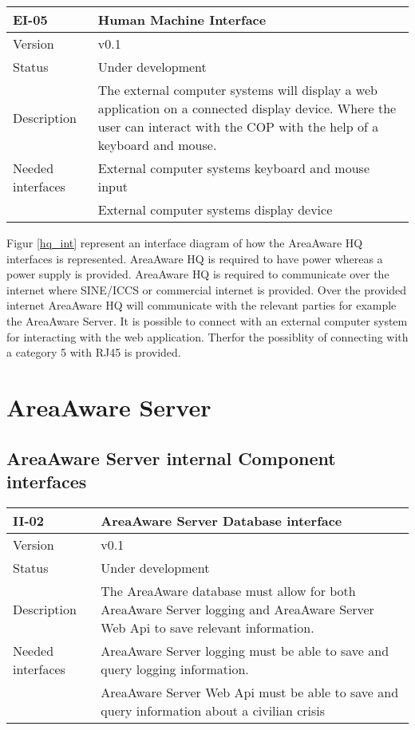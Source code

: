 \begin{longtable}{| p{3.5cm} |  p{10cm} | }
	\hline
	\textbf{EI-05} &  \textbf{Human Machine Interface} \\
	\hline
	Version & v0.1 \\
	\hline
	Status & Under development \\
	\hline
	Description & The external computer systems will display a web application on a connected display device. Where the user can interact with the COP with the help of a keyboard and mouse.
	\\
	\hline
	Needed interfaces 
	& External computer systems keyboard and mouse input \\
	& External computer systems display device \\ 
	\hline
\end{longtable}
\clearpage
{} 

Figur \ref{hq_int} represent an interface diagram of how the AreaAware HQ interfaces is represented. AreaAware HQ is required to have power whereas a power supply is provided. AreaAware HQ is required to communicate over the internet where SINE/ICCS or commercial internet is provided. Over the provided internet AreaAware HQ will communicate with the relevant parties for example the AreaAware Server. It is possible to connect with an external computer system for interacting with the web application. Therfor the possiblity of connecting with a category 5 with RJ45 is provided. 


\newpage

\section{AreaAware Server}
\label{sec:areaAwareserver}

\subsection{AreaAware Server internal Component interfaces}


\begin{longtable}{| p{3.5cm} |  p{10cm} | }
	\hline
	\textbf{II-02} &  \textbf{AreaAware Server Database interface } \\
	\hline
	Version & v0.1 \\
	\hline
	Status & Under development \\
	\hline
	Description & The AreaAware database must allow for both AreaAware Server logging and AreaAware Server Web Api to save relevant information.\\
	\hline
	Needed interfaces & AreaAware Server logging must be able to save and query logging information.\\
	& AreaAware Server Web Api must be able to save and query  information about a civilian crisis \\
	\hline
\end{longtable}

